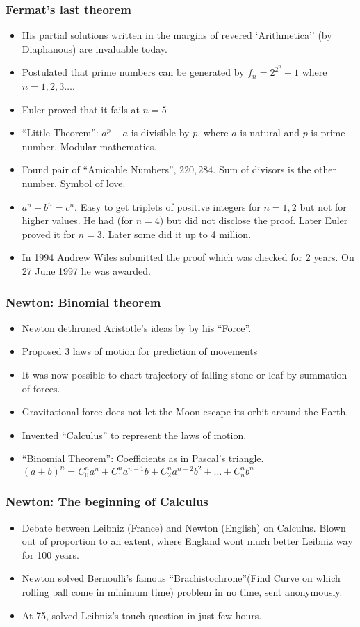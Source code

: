 \begin{frame}[fragile]
\frametitle{Fermat's last theorem}
\begin{itemize}
\item His partial solutions written in the margins of  revered `Arithmetica'' (by Diaphanous) are invaluable today.
\item Postulated that prime numbers can be generated by $f_n = 2^{2^n} +1$ where $n = 1,2,3 \ldots$. 
\item Euler proved that it fails at $n=5$
\item ``Little Theorem'': $a^p -a$ is divisible by $p$, where $a$ is natural and $p$ is prime number. Modular mathematics.
\item Found pair of ``Amicable Numbers'', $220,284$. Sum of divisors is the other number. Symbol of love.
\item $a^n + b^n = c^n$. Easy to get triplets of positive integers for $n=1,2$ but not for higher values. He had (for $n=4$) but did not disclose the proof. Later Euler proved it for $n=3$. Later some did it up to 4 million.
\item In 1994 Andrew Wiles submitted the proof which was checked for 2 years. On 27 June 1997 he was awarded.
\end{itemize}
\end{frame}

\begin{frame}[fragile]
\frametitle{Newton: Binomial theorem}
\begin{itemize}
\item Newton dethroned Aristotle's ideas by by his ``Force''.
\item Proposed 3 laws of motion for prediction of movements
\item It was now possible to chart trajectory of falling stone or leaf by summation of forces.
\item Gravitational force does not let the Moon escape its orbit around the Earth.
\item Invented ``Calculus'' to represent the laws of motion.
\item ``Binomial Theorem'': Coefficients as in Pascal's triangle. $(a+b)^n = C^n_0 a^n + C^n_1 a^{n-1}b + C^n_2 a^{n-2} b^2 + \ldots + C^n_nb^n$
\end{itemize}
\end{frame}

\begin{frame}[fragile]
\frametitle{Newton: The beginning of Calculus}
\begin{itemize}
\item Debate between Leibniz (France) and Newton (English) on Calculus. Blown out of proportion to an extent, where England wont much better Leibniz way for 100 years.
\item Newton solved Bernoulli's famous ``Brachistochrone''(Find Curve on which rolling ball come in minimum time) problem in no time, sent anonymously.
\item At 75, solved Leibniz's touch question in just few hours.
\end{itemize}
\end{frame}


